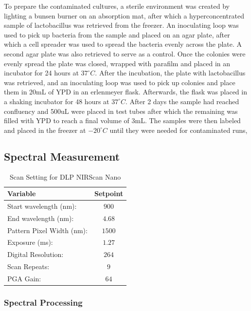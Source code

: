 \documentclass[12pt]{report}
\begin{document}
To prepare the contaminated cultures, a sterile environment was created by lighting a bunsen burner on an absorption mat, after which a hyperconcentrated sample of lactobacillus was retrieved from the freezer. An inoculating loop was used to pick up bacteria from the sample and placed on an agar plate, after which a cell spreader was used to spread the bacteria evenly across the plate. A second agar plate was also retrieved to serve as a control. Once the colonies were evenly spread the plate was closed, wrapped with parafilm and placed in an incubator for 24 hours at $37^{\circ}C$. After the incubation, the plate with lactobacillus was retrieved, and an inoculating loop was used to pick up colonies and place them in 20mL of YPD in an erlenmeyer flask. Afterwards, the flask was placed in a shaking incubator for 48 hours at $37^{\circ}C$. After 2 days the sample had reached confluency and 500uL were placed in test tubes after which the remaining was filled with YPD to reach a final volume of 3mL. The samples were then labeled and placed in the freezer at $-20^{\circ}C$ until they were needed for contaminated runs,   

\subsection{Spectral Measurement}

\begin{table}
    \centering
        \begin{tabular}{l c}
        \toprule
        Variable & Setpoint\\
        \midrule
        Start wavelength (nm): & $900$ \\
        End wavelength (nm): & $4.68$ \\
        Pattern Pixel Width (nm): & $1500$ \\
        Exposure (ms): & $1.27$ \\
        Digital Resolution: & $264$ \\
        Scan Repeats: & $9$ \\
        PGA Gain: & $64$ \\
        \bottomrule
        \end{tabular}
        \caption{Scan Setting for DLP NIRScan Nano}
        \label{tab:scaninfo}
\end{table}

\subsubsection{Spectral Processing}
\end{document}
